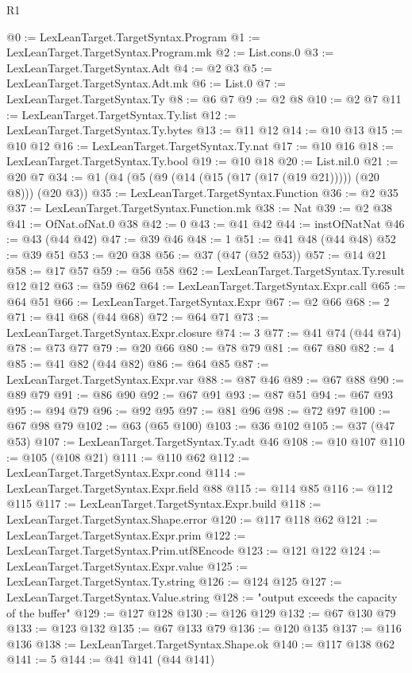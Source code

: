 \begin{lexlean}{R1}
\begin{coremodule}
@0 := LexLeanTarget.TargetSyntax.Program
@1 := LexLeanTarget.TargetSyntax.Program.mk
@2 := List.cons.{0}
@3 := LexLeanTarget.TargetSyntax.Adt
@4 := @2 @3
@5 := LexLeanTarget.TargetSyntax.Adt.mk
@6 := List.{0}
@7 := LexLeanTarget.TargetSyntax.Ty
@8 := @6 @7
@9 := @2 @8
@10 := @2 @7
@11 := LexLeanTarget.TargetSyntax.Ty.list
@12 := LexLeanTarget.TargetSyntax.Ty.bytes
@13 := @11 @12
@14 := @10 @13
@15 := @10 @12
@16 := LexLeanTarget.TargetSyntax.Ty.nat
@17 := @10 @16
@18 := LexLeanTarget.TargetSyntax.Ty.bool
@19 := @10 @18
@20 := List.nil.{0}
@21 := @20 @7
@34 := @1 (@4 (@5 (@9 (@14 (@15 (@17 (@17 (@19 @21))))) (@20 @8))) (@20 @3))
@35 := LexLeanTarget.TargetSyntax.Function
@36 := @2 @35
@37 := LexLeanTarget.TargetSyntax.Function.mk
@38 := Nat
@39 := @2 @38
@41 := OfNat.ofNat.{0} @38
@42 := 0
@43 := @41 @42
@44 := instOfNatNat
@46 := @43 (@44 @42)
@47 := @39 @46
@48 := 1
@51 := @41 @48 (@44 @48)
@52 := @39 @51
@53 := @20 @38
@56 := @37 (@47 (@52 @53))
@57 := @14 @21
@58 := @17 @57
@59 := @56 @58
@62 := LexLeanTarget.TargetSyntax.Ty.result @12 @12
@63 := @59 @62
@64 := LexLeanTarget.TargetSyntax.Expr.call
@65 := @64 @51
@66 := LexLeanTarget.TargetSyntax.Expr
@67 := @2 @66
@68 := 2
@71 := @41 @68 (@44 @68)
@72 := @64 @71
@73 := LexLeanTarget.TargetSyntax.Expr.closure
@74 := 3
@77 := @41 @74 (@44 @74)
@78 := @73 @77
@79 := @20 @66
@80 := @78 @79
@81 := @67 @80
@82 := 4
@85 := @41 @82 (@44 @82)
@86 := @64 @85
@87 := LexLeanTarget.TargetSyntax.Expr.var
@88 := @87 @46
@89 := @67 @88
@90 := @89 @79
@91 := @86 @90
@92 := @67 @91
@93 := @87 @51
@94 := @67 @93
@95 := @94 @79
@96 := @92 @95
@97 := @81 @96
@98 := @72 @97
@100 := @67 @98 @79
@102 := @63 (@65 @100)
@103 := @36 @102
@105 := @37 (@47 @53)
@107 := LexLeanTarget.TargetSyntax.Ty.adt @46
@108 := @10 @107
@110 := @105 (@108 @21)
@111 := @110 @62
@112 := LexLeanTarget.TargetSyntax.Expr.cond
@114 := LexLeanTarget.TargetSyntax.Expr.field @88
@115 := @114 @85
@116 := @112 @115
@117 := LexLeanTarget.TargetSyntax.Expr.build
@118 := LexLeanTarget.TargetSyntax.Shape.error
@120 := @117 @118 @62
@121 := LexLeanTarget.TargetSyntax.Expr.prim
@122 := LexLeanTarget.TargetSyntax.Prim.utf8Encode
@123 := @121 @122
@124 := LexLeanTarget.TargetSyntax.Expr.value
@125 := LexLeanTarget.TargetSyntax.Ty.string
@126 := @124 @125
@127 := LexLeanTarget.TargetSyntax.Value.string
@128 := "output exceeds the capacity of the buffer"
@129 := @127 @128
@130 := @126 @129
@132 := @67 @130 @79
@133 := @123 @132
@135 := @67 @133 @79
@136 := @120 @135
@137 := @116 @136
@138 := LexLeanTarget.TargetSyntax.Shape.ok
@140 := @117 @138 @62
@141 := 5
@144 := @41 @141 (@44 @141)

\end{coremodule}
\end{lexlean}
